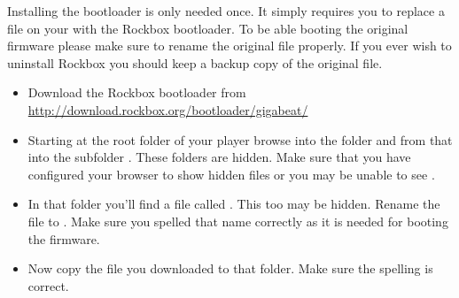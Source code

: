 
Installing the bootloader is only needed once. It simply requires you
to replace a file on your \dap{} with the Rockbox bootloader. To be able
booting the original firmware please make sure to rename the original file
properly. If you ever wish to uninstall Rockbox you should keep a backup copy
of the original file.

\begin{itemize}
\item Download the Rockbox bootloader from
  \url{http://download.rockbox.org/bootloader/gigabeat/}
\item Starting at the root folder of your player browse into the folder
   and from that into the subfolder .
  These folders are hidden. Make sure that you have configured your browser
  to show hidden files or you may be unable to see .
\item In that folder you'll find a file called . This too
  may be hidden. Rename the file to . Make sure you
  spelled that name  correctly as it is needed for booting the \playerman{} firmware.
\item Now copy the file  you downloaded to that folder.
  Make sure the spelling is correct.
\end{itemize}

